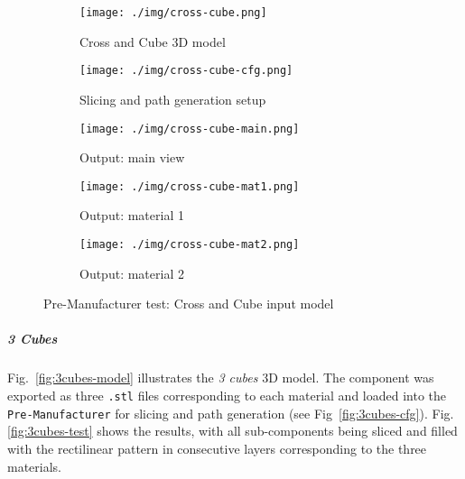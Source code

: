 \begin{figure}[htbp!]
  \centering
  \begin{subfigure}[t]{0.8\textwidth}
  \centering
  \texttt{[image: ./img/cross-cube.png]}
  \caption{Cross and Cube 3D model}%
  \label{fig:cross-cube-model}
  \end{subfigure}
%
  \begin{subfigure}[t]{0.48\textwidth}
  \centering
  \texttt{[image: ./img/cross-cube-cfg.png]}
  \caption{Slicing and path generation setup}%
  \label{fig:cross-cube-cfg}
\end{subfigure}
%
  \begin{subfigure}[t]{0.48\textwidth}
  \centering
  \texttt{[image: ./img/cross-cube-main.png]}
  \caption{Output: main view}%
  \label{fig:cross-cube-main}
\end{subfigure}
%
  \begin{subfigure}[t]{0.48\textwidth}
  \centering
  \texttt{[image: ./img/cross-cube-mat1.png]}
  \caption{Output: material 1}%
  \label{fig:cross-cube-mat1}
\end{subfigure}
%
  \begin{subfigure}[t]{0.48\textwidth}
  \centering
  \texttt{[image: ./img/cross-cube-mat2.png]}
  \caption{Output: material 2}%
  \label{fig:cross-cube-mat2}
\end{subfigure}
%
  \caption{Pre-Manufacturer test: Cross and Cube input model}%
  \label{fig:cross-cube-test}
\end{figure}

\subparagraph{3 Cubes}
Fig.~\ref{fig:3cubes-model} illustrates the \emph{3 cubes} 3D model. The component was exported as
three \texttt{.stl} files corresponding to each material and loaded into the
\texttt{Pre-Manufacturer} for slicing and path
generation (see Fig~\ref{fig:3cubes-cfg}). Fig.\ref{fig:3cubes-test} shows the results, with all sub-components being sliced and filled
with the rectilinear pattern in consecutive layers corresponding to the three
materials.

